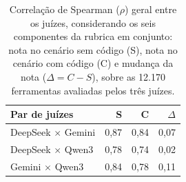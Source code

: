 \begin{table}[H]
\centering
\caption{Correlação de Spearman ($\rho$) geral entre os juízes, considerando os seis componentes da rubrica em conjunto: nota no cenário sem código (S), nota no cenário com código (C) e mudança da nota ($\Delta = C - S$), sobre as 12.170 ferramentas avaliadas pelos três juízes.}
\label{tab:correlacao-juizes-geral}
\begin{tabular}{lrrr}
\toprule
\textbf{Par de juízes} & \textbf{S} & \textbf{C} & \textbf{$\Delta$} \\
\midrule
DeepSeek $\times$ Gemini & 0,87 & 0,84 & 0,07 \\
DeepSeek $\times$ Qwen3 & 0,78 & 0,74 & 0,02 \\
Gemini $\times$ Qwen3 & 0,84 & 0,78 & 0,11 \\
\bottomrule
\end{tabular}
\end{table}
